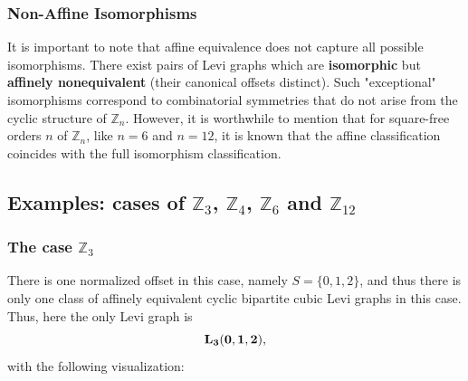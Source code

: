 \documentclass[12pt,letterpaper]{amsart}
\begin{document}
\subsubsection{Non-Affine Isomorphisms}
It is important to note that affine equivalence does not capture all possible isomorphisms. There exist pairs of Levi graphs which are \textbf{isomorphic} but \textbf{affinely nonequivalent} (their canonical offsets distinct). Such "exceptional" isomorphisms correspond to combinatorial symmetries that do not arise from the cyclic structure of $\mathbb{Z}_n$. However, it is worthwhile to mention that for square-free orders $n$ of $\mathbb Z_n$, like $n=6$ and $n=12$, it is known \cite{muzychuk1995} that the affine classification coincides with the full isomorphism classification.

\subsection{Examples: cases of   $\mathbb{Z}_3$,  $\mathbb{Z}_4$,  $\mathbb{Z}_6$ and $\mathbb{Z}_{12}$}

\subsubsection{The case  $\mathbb{Z}_3$}
There is one normalized offset in this case, namely $S=\{0,1,2\}$, and thus there is only one class of affinely equivalent cyclic bipartite cubic Levi graphs in this case. Thus, here the only Levi graph is
$${\bf L_3(0,1,2)},$$
  with the following visualization:
\end{document}
